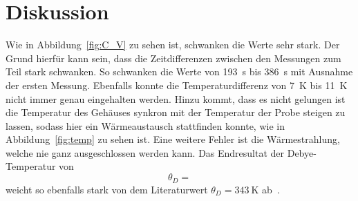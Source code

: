 

\section{Diskussion}

Wie in Abbildung~\ref{fig:C_V} zu sehen ist, schwanken die Werte sehr stark.
Der Grund hierfür kann sein, dass die Zeitdifferenzen zwischen den Messungen
zum Teil stark schwanken. So schwanken die Werte von \SI{193}{\second} bis
\SI{386}{\second} mit Ausnahme der ersten Messung.  Ebenfalls konnte die
Temperaturdifferenz von \SI{7}{\kelvin} bis \SI{11}{\kelvin} nicht immer genau
eingehalten werden.  Hinzu kommt, dass es nicht gelungen ist die Temperatur des
Gehäuses synkron mit der Temperatur der Probe steigen zu lassen, sodass hier
ein Wärmeaustausch stattfinden konnte, wie in Abbildung~\ref{fig:temp} zu
sehen ist.  Eine weitere Fehler ist die
Wärmestrahlung, welche nie ganz ausgeschlossen werden kann.  Das Endresultat
der Debye-Temperatur von
\begin{equation}
  \theta_D = 
\end{equation}
weicht so ebenfalls stark von dem Literaturwert
$\theta_D = \SI{343}{\kelvin}$ ab~\cite{DEB}.
